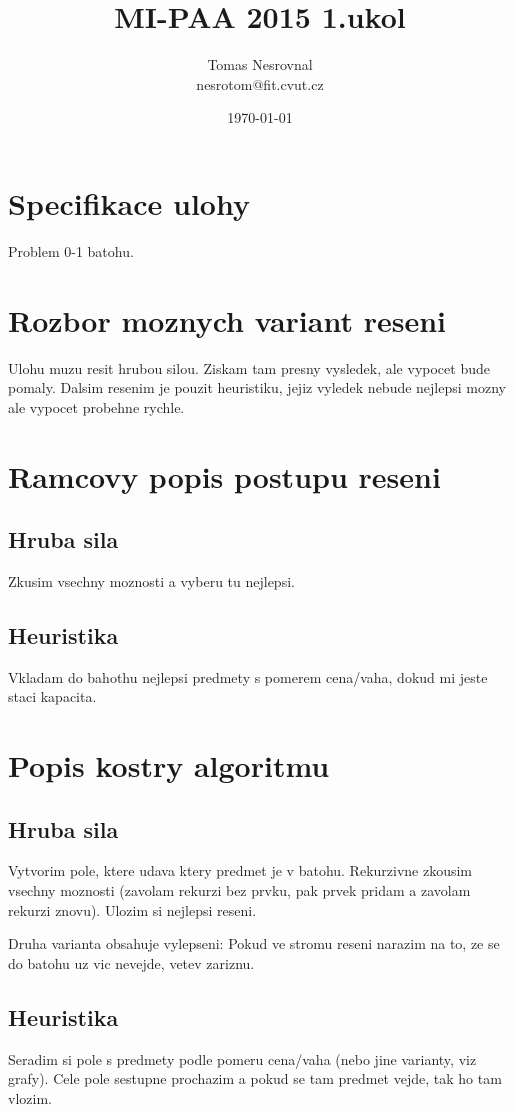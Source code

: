 \documentclass[12pt,a4paper]{article}
\begin{document}
\title{MI-PAA 2015 1.ukol}
\author{Tomas Nesrovnal\\nesrotom@fit.cvut.cz}
\date{\today}
\maketitle

\section{Specifikace ulohy}
Problem 0-1 batohu.

\section{Rozbor moznych variant reseni}
Ulohu muzu resit hrubou silou. Ziskam tam presny vysledek, ale vypocet bude
pomaly. Dalsim resenim je pouzit heuristiku, jejiz vyledek nebude nejlepsi mozny
ale vypocet probehne rychle.

\section{Ramcovy popis postupu reseni}
\subsection{Hruba sila}
Zkusim vsechny moznosti a vyberu tu nejlepsi.
\subsection{Heuristika}
Vkladam do bahothu nejlepsi predmety s pomerem cena/vaha, dokud
mi jeste staci kapacita.

\section{Popis kostry algoritmu}
\subsection{Hruba sila}
Vytvorim pole, ktere udava ktery predmet je v batohu. Rekurzivne zkousim
vsechny moznosti (zavolam rekurzi bez prvku, pak prvek pridam a zavolam rekurzi znovu).
Ulozim si nejlepsi reseni.

Druha varianta obsahuje vylepseni: Pokud ve stromu reseni narazim na to, ze se do batohu uz vic nevejde, vetev zariznu.
\subsection{Heuristika}
Seradim si pole s predmety podle pomeru cena/vaha (nebo jine varianty, viz grafy). Cele pole sestupne prochazim a pokud se tam predmet vejde, tak ho tam vlozim.
\end{document}
